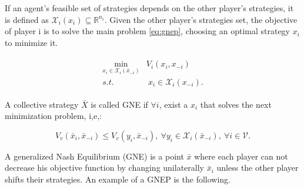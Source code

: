 \begin{definition}
If an agent's feasible set of strategies depends on the other player's strategies, it is defined as $\mathcal{X}_i(x_i) \subseteq \mathbb{R}^{n_i}$. Given the other player's strategies set, the objective of player i is to solve the main problem  \ref{eq:gnep}, choosing an optimal strategy $x_i$ to minimize it.

\begin{align}
\begin{matrix}
    \min_{x_i \in \mathcal{X}_i(\bar{x}_{-i})} & V_i(x_i, x_{-i}) \\
s.t. & \ x_i \in \mathcal{X}_i(x_{-i}).
\end{matrix} \label{eq:gnep}
\end{align}

A collective strategy $\bar{X}$ is called GNE if $\forall i$, exist a $x_i$ that solves the next minimization problem,
i,e,:

\begin{equation}
    V_v(\bar{x}_i, \bar{x}_{-i}) \le V_v(y_i, \bar{x}_{-i}), \ \forall y_i \in \mathcal{X}_i(\bar{x}_{-i}), \ \forall i \in \mathcal{V}.
\end{equation}

\end{definition}

A generalized Nash Equilibrium (GNE) is a point $\bar{x}$ where each player can not decrease his objective function by changing unilaterally $\bar{x}_i$ unless the other player shifts their strategies. An example of a GNEP is the following.


